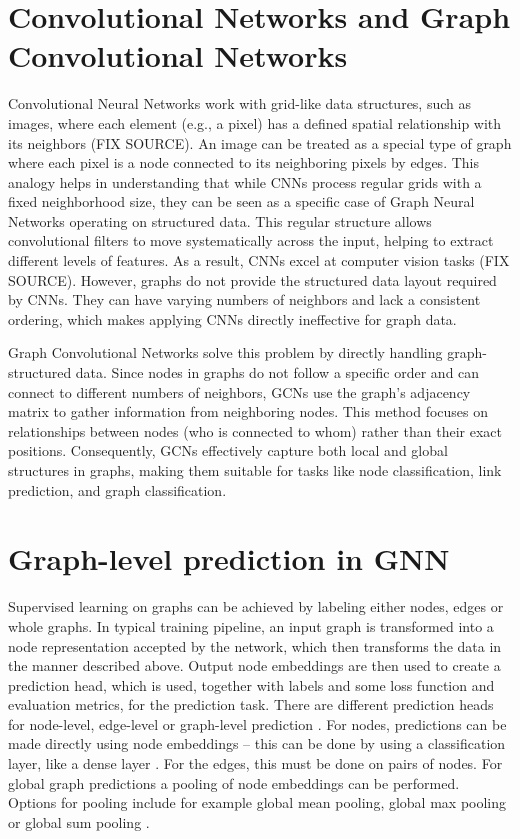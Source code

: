\section{Convolutional Networks and Graph Convolutional Networks}
Convolutional Neural Networks work with grid-like data structures, such as images, where each element (e.g., a pixel) has a defined spatial relationship with its neighbors (FIX SOURCE). An image can be treated as a special type of graph where each pixel is a node connected to its neighboring pixels by edges. This analogy helps in understanding that while CNNs process regular grids with a fixed neighborhood size, they can be seen as a specific case of Graph Neural Networks operating on structured data. This regular structure allows convolutional filters to move systematically across the input, helping to extract different levels of features. As a result, CNNs excel at computer vision tasks (FIX SOURCE). However, graphs do not provide the structured data layout required by CNNs. They can have varying numbers of neighbors and lack a consistent ordering, which makes applying CNNs directly ineffective for graph data.

Graph Convolutional Networks solve this problem by directly handling graph-structured data. Since nodes in graphs do not follow a specific order and can connect to different numbers of neighbors, GCNs use the graph's adjacency matrix to gather information from neighboring nodes. This method focuses on relationships between nodes (who is connected to whom) rather than their exact positions. Consequently, GCNs effectively capture both local and global structures in graphs, making them suitable for tasks like node classification, link prediction, and graph classification.


\section{Graph-level prediction in GNN}
Supervised learning on graphs can be achieved by labeling either nodes, edges or whole graphs. In typical training pipeline, an input graph is transformed into a node representation accepted by the network, which then transforms the data in the manner described above. Output node embeddings are then used to create a prediction head, which is used, together with labels and some loss function and evaluation metrics, for the prediction task. There are different prediction heads for node-level, edge-level or graph-level prediction \cite{Lesk2024}. For nodes, predictions can be made directly using node embeddings -- this can be done by using a classification layer, like a dense layer \cite{sanch2021}.  For the edges, this must be done on pairs of nodes. For global graph predictions a pooling of node embeddings can be performed. Options for pooling include for example global mean pooling, global max pooling or global sum pooling \cite{Lesk2024}.